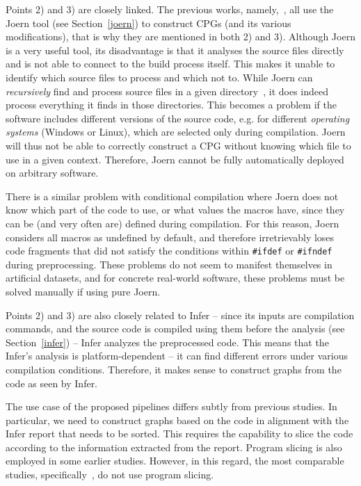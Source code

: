 Points 2) and 3) are closely linked. The previous works, namely,~\cite{GNN1-cao2021bgnn4vd, JOERN-CPG-guan2020code, GNN4-IBM-suneja2020learning, JOERN-CPG-xiaomeng2018cpgva, GNN2-zhou2019devign}, all use the Joern tool (see Section~\ref{joern}) to construct CPGs (and its various modifications), that is why they are mentioned in both 2) and 3). Although Joern is a very useful tool, its disadvantage is that it analyses the source files directly and is not able to connect to the build process itself. This makes it unable to identify which source files to process and which not to. While Joern can \textit{recursively} find and process source files in a given directory~\cite{joern-doc}, it does indeed process everything it finds in those directories. This becomes a problem if the software includes different versions of the source code, e.g. for different \textit{operating systems} (Windows or Linux), which are selected only during compilation. Joern will thus not be able to correctly construct a CPG without knowing which file to use in a given context. Therefore, Joern cannot be fully automatically deployed on arbitrary software. 

There is a similar problem with conditional compilation where Joern does not know which part of the code to use, or what values the macros have, since they can be (and very often are) defined during compilation. For this reason, Joern considers all macros as undefined by default, and therefore irretrievably loses code fragments that did not satisfy the conditions within \texttt{\#ifdef} or \texttt{\#ifndef} during preprocessing. These problems do not seem to manifest themselves in artificial datasets, and for concrete real-world software, these problems must be solved manually if using pure Joern.

Points 2) and 3) are also closely related to Infer -- since its inputs are compilation commands, and the source code is compiled using them before the analysis (see Section~\ref{infer}) -- Infer analyzes the preprocessed code. This means that the Infer's analysis is platform-dependent -- it can find different errors under various compilation conditions. Therefore, it makes sense to construct graphs from the code as seen by Infer.

The use case of the proposed pipelines differs subtly from previous studies. In particular, we need to construct graphs based on the code in alignment with the Infer report that needs to be sorted. This requires the capability to slice the code according to the information extracted from the report. Program slicing is also employed in some earlier studies. However, in this regard, the most comparable studies, specifically~\cite{D2A-zheng2021d2a, pujar2024analyzing}, do not use program slicing.

